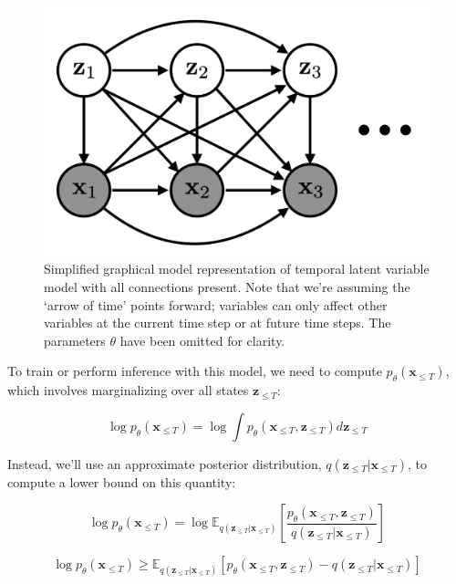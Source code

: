 \begin{figure}[h]
    \centering
    \includegraphics[width=.5\textwidth]{images/graphical_models/full_temporal_model.png}
    \caption{Simplified graphical model representation of temporal latent variable model with all connections present. Note that we're assuming the `arrow of time' points forward; variables can only affect other variables at the current time step or at future time steps. The parameters $\theta$ have been omitted for clarity.}
    \label{fig: full_temporal_model}
\end{figure}

To train or perform inference with this model, we need to compute $p_\theta (\mathbf{x}_{\leq T})$, which involves marginalizing over all states $\mathbf{z}_{\leq T}$:

\begin{equation}
	\log p_\theta (\mathbf{x}_{\leq T}) = \log \int p_\theta (\mathbf{x}_{\leq T}, \mathbf{z}_{\leq T}) d \mathbf{z}_{\leq T}
\end{equation}

\noindent Instead, we'll use an approximate posterior distribution, $q (\mathbf{z}_{\leq T} | \mathbf{x}_{\leq T})$, to compute a lower bound on this quantity:

\begin{equation}
	\log p_\theta (\mathbf{x}_{\leq T}) = \log \mathbb{E}_{q (\mathbf{z}_{\leq T} | \mathbf{x}_{\leq T})} \left[ \frac{p_\theta (\mathbf{x}_{\leq T}, \mathbf{z}_{\leq T})}{q (\mathbf{z}_{\leq T} | \mathbf{x}_{\leq T})} \right]
\end{equation}

\begin{equation}
	\log p_\theta (\mathbf{x}_{\leq T}) \geq \mathbb{E}_{q (\mathbf{z}_{\leq T} | \mathbf{x}_{\leq T})} \left[ p_\theta (\mathbf{x}_{\leq T}, \mathbf{z}_{\leq T}) - q (\mathbf{z}_{\leq T} | \mathbf{x}_{\leq T}) \right]
\end{equation}
